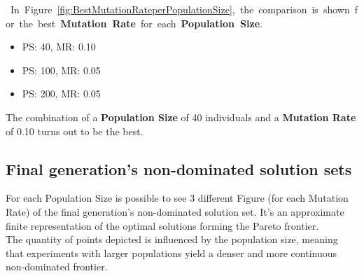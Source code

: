 \documentclass{article}
\begin{document}
\newpage
\hbox{
In Figure \ref{fig:BestMutationRateperPopulationSize}, the comparison is shown for the best \textbf{Mutation Rate} for each \textbf{Population Size}.\\
}
\begin{itemize}
  \item PS: 40, MR: 0.10
  \item PS: 100, MR: 0.05
  \item PS: 200, MR: 0.05
\end{itemize}
The combination of a \textbf{Population Size} of 40 individuals and a \textbf{Mutation Rate} of 0.10 turns out to be the best.\\

\subsection{Final generation's non-dominated solution sets}
For each Population Size is possible to see 3 different Figure (for each Mutation Rate) of the final generation's non-dominated solution set. It's an approximate finite representation of the optimal solutions forming the Pareto frontier.\\
The quantity of points depicted is influenced by the population size, meaning that experiments with larger populations yield a denser and more continuous non-dominated frontier.\\
\end{document}
